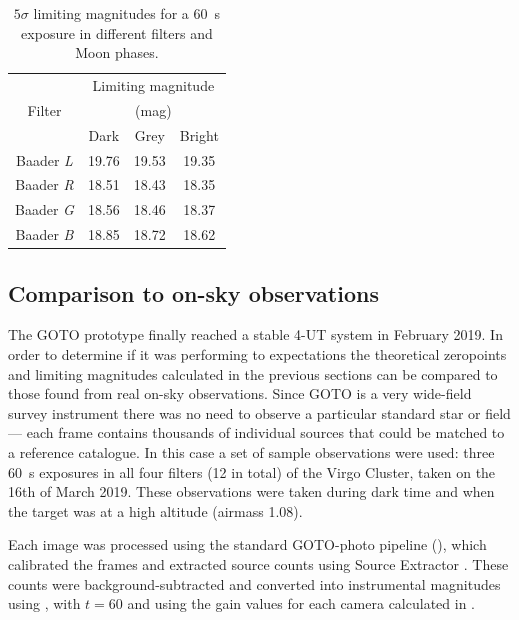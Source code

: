 \begin{colsection}
\begin{colsection}
\begin{table}[t]
    \begin{center}
        \begin{tabular}{c|ccc} %
                   & \multicolumn{3}{c}{Limiting magnitude} \\
            Filter & \multicolumn{3}{c}{(mag)} \\
                   & Dark & Grey & Bright \\
            \midrule
            Baader \textit{L} & 19.76 & 19.53 & 19.35 \\
            Baader \textit{R} & 18.51 & 18.43 & 18.35 \\
            Baader \textit{G} & 18.56 & 18.46 & 18.37 \\
            Baader \textit{B} & 18.85 & 18.72 & 18.62 \\
        \end{tabular}
    \end{center}
    \caption[$5\sigma$ limiting magnitudes for a \SI{60}{\second} exposure]{
        $5\sigma$ limiting magnitudes for a \SI{60}{\second} exposure in different filters and Moon phases.
    }\label{tab:lim_mags}
\end{table}

\end{colsection}

\newpage
\subsection{Comparison to on-sky observations}
\label{sec:onsky_comparison}
\begin{colsection}

The GOTO prototype finally reached a stable 4-UT system in February 2019. In order to determine if it was performing to expectations the theoretical zeropoints and limiting magnitudes calculated in the previous sections can be compared to those found from real on-sky observations. Since GOTO is a very wide-field survey instrument there was no need to observe a particular standard star or field --- each frame contains thousands of individual sources that could be matched to a reference catalogue. In this case a set of sample observations were used: three \SI{60}{\second} exposures in all four filters (12 in total) of the Virgo Cluster, taken on the 16th of March 2019. These observations were taken during dark time and when the target was at a high altitude (airmass 1.08).

Each image was processed using the standard GOTO-photo pipeline (), which calibrated the frames and extracted source counts using Source Extractor \citep{SE}. These counts were background-subtracted and converted into instrumental magnitudes using , with $t=60$ and using the gain values for each camera calculated in .


\end{colsection}
\end{colsection}
